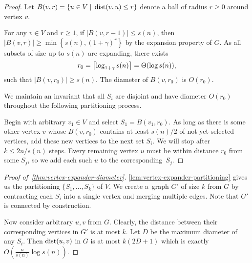 \begin{proof}
    Let $B(v,r)=\{u\in V\;|\;\operatorname*{dist}(v,u)\leq r\}$ denote
    a ball of radius $r\geq 0$ around vertex $v$.
    
    For any $v\in V$ and $r\geq 1$, if $|B(v,r-1)|\leq s(n)$,
    then $|B(v,r)|\geq\min\left\{s(n),(1+\gamma)^r\right\}$
    by the expansion property of $G$.
    As all subsets of size up to $s(n)$ are expanding, there exists
    \begin{equation}
        r_0={\left\lceil{\log_{1+\gamma}s(n)}\right\rceil}=\Theta(\log s(n)),
    \end{equation}
    such that $|B(v,r_0)|\geq s(n)$. The diameter of $B(v,r_0)$ is $O(r_0)$.
    
    We maintain an invariant that all $S_i$ are disjoint
    and have diameter $O(r_0)$ throughout the following partitioning process.
    
    Begin with arbitrary $v_1\in V$ and select $S_1=B(v_1,r_0)$.
    As long as there is some other vertex $v$ whose $B(v,r_0)$ contains
    at least $s(n)/2$ of not yet selected vertices,
    add these new vertices to the next set $S_i$.
    We will stop after $k\leq2n/s(n)$ steps.
    Every remaining vertex $u$ must be within distance $r_0$ from some $S_j$,
    so we add each such $u$ to the corresponding~$S_j$.
\end{proof}

\begin{proof}[Proof of~\autoref{thm:vertex-expander-diameter}]
    \autoref{lem:vertex-expander-partitioning} gives us
    the partitioning $\{S_1,\ldots,S_k\}$ of $V$.
    We create a~graph $G'$ of size $k$ from $G$ by contracting each $S_i$
    into a single vertex and merging multiple edges.
    Note that $G'$ is connected by construction.
    
    Now consider arbitrary $u,v$ from $G$. Clearly, the distance between
    their corresponding vertices in $G'$ is at most $k$.
    Let $D$ be the maximum diameter of any $S_i$.
    Then $\operatorname*{dist}(u,v)$ in $G$ is at most $k(2D+1)$
    which is exactly $O\left(\frac{n}{s(n)}\log s(n)\right)$.
\end{proof}

